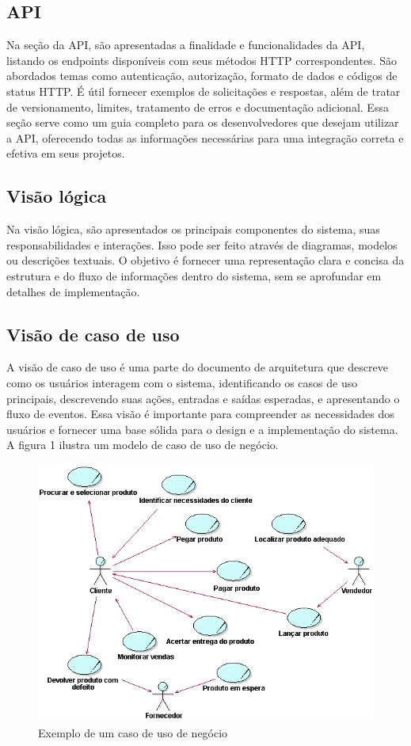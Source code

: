 \documentclass[12pt]{article}
\begin{document}
\subsection{API}
Na seção da API, são apresentadas a finalidade e funcionalidades da API, listando os endpoints disponíveis com seus métodos HTTP correspondentes. São abordados temas como autenticação, autorização, formato de dados e códigos de status HTTP. É útil fornecer exemplos de solicitações e respostas, além de tratar de versionamento, limites, tratamento de erros e documentação adicional. Essa seção serve como um guia completo para os desenvolvedores que desejam utilizar a API, oferecendo todas as informações necessárias para uma integração correta e efetiva em seus projetos.

\subsection{Visão lógica}
Na visão lógica, são apresentados os principais componentes do sistema, suas responsabilidades e interações. Isso pode ser feito através de diagramas, modelos ou descrições textuais. O objetivo é fornecer uma representação clara e concisa da estrutura e do fluxo de informações dentro do sistema, sem se aprofundar em detalhes de implementação.

\subsection{Visão de caso de uso}
A visão de caso de uso é uma parte do documento de arquitetura que descreve como os usuários interagem com o sistema, identificando os casos de uso principais, descrevendo suas ações, entradas e saídas esperadas, e apresentando o fluxo de eventos. Essa visão é importante para compreender as necessidades dos usuários e fornecer uma base sólida para o design e a implementação do sistema. A figura 1 ilustra um modelo de caso de uso de negócio.
\begin{figure}[ht]
\centering
\includegraphics[width=.7\textwidth, scale=6.7]{caso.png}
\caption{Exemplo de um caso de uso de negócio}
\label{fig:typical-figure}
\end{figure}
\end{document}

